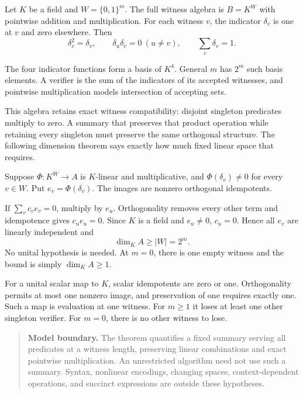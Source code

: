 Let $K$ be a field and $W=\{0,1\}^m$. The full witness algebra is
$B=K^W$ with pointwise addition and multiplication. For each witness $v$,
the indicator $\delta_v$ is one at $v$ and zero elsewhere. Then
\[
 \delta_v^2=\delta_v,\qquad \delta_u\delta_v=0\ (u\ne v),
 \qquad \sum_v\delta_v=1.
\]


The four indicator functions form a basis of $K^4$. General $m$ has $2^m$
such basis elements. A verifier is the sum of the indicators of its accepted
witnesses, and pointwise multiplication models intersection of accepting
sets.

This algebra retains exact witness compatibility: disjoint singleton
predicates multiply to zero. A summary that preserves that product operation
while retaining every singleton must preserve the same orthogonal structure.
The following dimension theorem says exactly how much fixed linear space
that requires.


Suppose $\Phi:K^W\to A$ is $K$-linear and multiplicative, and
$\Phi(\delta_v)\ne0$ for every $v\in W$. Put $e_v=\Phi(\delta_v)$.
The images are nonzero orthogonal idempotents.

If $\sum_v c_v e_v=0$, multiply by $e_u$. Orthogonality removes every other
term and idempotence gives $c_u e_u=0$. Since $K$ is a field and $e_u\ne0$,
$c_u=0$. Hence all $e_v$ are linearly independent and
\[
 \boxed{\dim_K A\ge |W|=2^m.}
\]
No unital hypothesis is needed. At $m=0$, there is one empty witness and
the bound is simply $\dim_K A\ge1$.

For a unital scalar map to $K$, scalar idempotents are zero or one.
Orthogonality permits at most one nonzero image, and preservation of one
requires exactly one. Such a map is evaluation at one witness. For $m\ge1$
it loses at least one other singleton verifier. For $m=0$, there is no other
witness to lose.

\begin{quote}\small
\textbf{Model boundary.} The theorem quantifies a fixed summary serving all
predicates at a witness length, preserving linear combinations and exact
pointwise multiplication. An unrestricted algorithm need not use such a
summary. Syntax, nonlinear encodings, changing spaces, context-dependent
operations, and succinct expressions are outside these hypotheses.
\end{quote}

